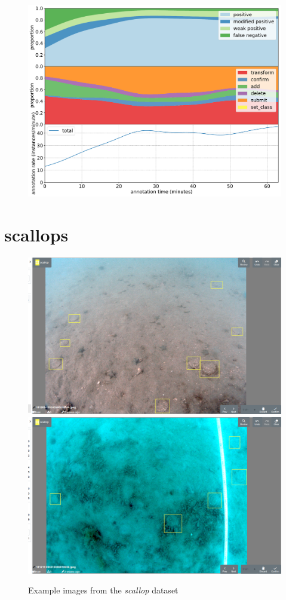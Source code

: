 \begin{figure}[!h]
\centering
\includegraphics[width=1.0\linewidth]{charts/action_annotations/branches.pdf}
\caption{  }
\label{fig:branches_annotation}
\end{figure}

\pagebreak
\section {scallops}
\label{sec:scallop_details}


\begin{figure}[!h]
  \includegraphics[width=0.475\linewidth]{figures/annotation/screenshots/scallops.png}
  \hfill
  \includegraphics[width=0.475\linewidth]{figures/annotation/screenshots/scallops3.png}
\caption{Example images from the \emph{scallop} dataset}
\label{fig:scallop_dataset}  
\end{figure}

